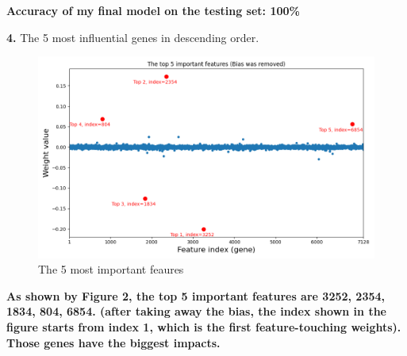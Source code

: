 \textbf{Accuracy of my final model on the testing set: 100\%}

\textbf{4.} The 5 most influential genes in descending order.

\begin{figure}[H]
    \centering
    \includegraphics[width=160mm]{top-5-important features.png}
    \caption{The 5 most important feaures}
    \label{fig:Feature-touching weights}
\end{figure}

\textbf{As shown by Figure 2, the top 5 important features are 3252, 2354, 1834, 804, 6854. (after taking away the bias, the index shown in the figure starts from index 1, which is the first feature-touching weights). Those genes have the biggest impacts.}